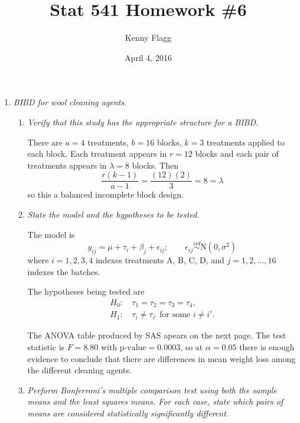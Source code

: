 \documentclass[11pt]{article}
\title{Stat 541 Homework \#6}
\author{Kenny Flagg}
\date{April 4, 2016}
\begin{document}
\thispagestyle{plain}
\maketitle

\begin{enumerate}

\item %
{\it BIBD for wool cleaning agents.}

\begin{enumerate}

\item %
{\it Verify that this study has the appropriate structure for a BIBD.}

There are \(a=4\) treatments, \(b=16\) blocks, \(k=3\) treatments applied to
each block. Each treatment appears in \(r=12\) blocks and each pair of
treatments appears in \(\lambda=8\) blocks. Then
\begin{equation*}
\frac{r(k-1)}{a-1}=\frac{(12)(2)}{3}=8=\lambda
\end{equation*}
so this a balanced incomplete block design.

\item %
{\it State the model and the hypotheses to be tested.}

The model is
\begin{equation*}
y_{ij}=\mu+\tau_i+\beta_j+\epsilon_{ij};\qquad
\epsilon_{ij}\overset{iid}{\sim}\mathrm{N}(0,\sigma^2)
\end{equation*}
where \(i=1,2,3,4\) indexes treatments A, B, C, D, and \(j=1,2,\dots,16\)
indexes the batches.

The hypotheses being tested are
\begin{align*}
H_0\text{: }&\tau_1=\tau_2=\tau_3=\tau_4\text{,}\\
H_1\text{: }&\tau_i\neq\tau_{i'}\text{ for some }i\neq i'\text{.}
\end{align*}

The ANOVA table produced by SAS apears on the next page. The test statistic
is \(F=8.80\) with \(\text{p-value}=0.0003\), so at \(\alpha=0.05\) there is
enough evidence to conclude that there are differences in mean weight loss
among the different cleaning agents.

\pagebreak


\item %
{\it Perform Bonferroni's multiple comparison test using both the sample means
and the least squares means. For each case, state which pairs of means are
considered statistically significantly different.}


\end{enumerate}
\end{enumerate}
\end{document}
